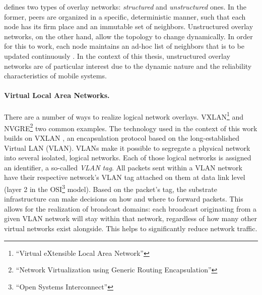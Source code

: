 \citeauthor*{tarkoma2010overlay} defines two types of overlay networks: \emph{structured} and \emph{unstructured} ones. In the former, peers are organized in a specific, deterministic manner, such that each node has its firm place and an immutable set of neighbors. Unstructured overlay networks, on the other hand, allow the topology to change dynamically. In order for this to work, each node maintains an ad-hoc list of neighbors that is to be updated continuously \cite{tanenbaum2017distributed}. In the context of this thesis, unstructured overlay networks are of particular interest due to the dynamic nature and the reliability characteristics of mobile systems. 

\paragraph{Virtual Local Area Networks.}
There are a number of ways to realize logical network overlays. VXLAN\footnote{``Virtual eXtensible Local Area Network''} and NVGRE\footnote{``Network Virtualization using Generic Routing Encapsulation''} two common examples. The technology used in the context of this work builds on VXLAN \cite{rfc7348}, an encapsulation protocol based on the long-established Virtual LAN (VLAN). VLANs make it possible to segregate a physical network into several isolated, logical networks. Each of those logical networks is assigned an identifier, a so-called \emph{VLAN tag}. All packets sent within a VLAN network have their respective network's VLAN tag attached on them at data link level (layer 2 in the OSI\footnote{``Open Systems Interconnect''} model). Based on the packet's tag, the substrate infrastructure can make decisions on how and where to forward packets. This allows for the realization of broadcast domains: each broadcast originating from a given VLAN network will stay within that network, regardless of how many other virtual networks exist alongside. This helps to significantly reduce network traffic.

